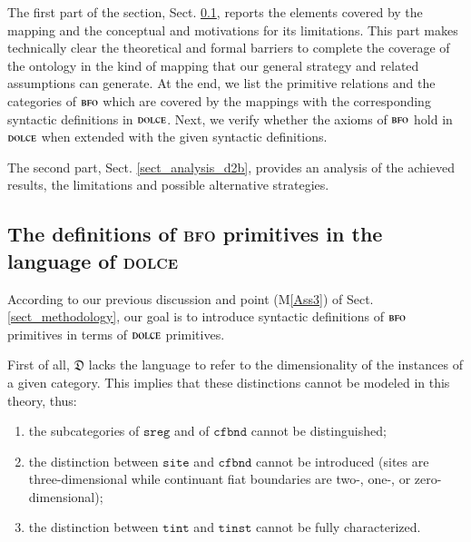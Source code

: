 \documentclass[ao]{iosart2x}
\newcommand{\nb}[1]{\textcolor{red}{$|$}\marginpar{\hspace*{-0cm}\parbox{20mm}{\scriptsize\raggedright\textcolor{red}{#1}}}}
\newcommand{\cn}[1]{\mathtt{#1}}
\newcommand{\dolce}{{\textsc{dolce}}}
\newcommand{\bfo}{{\textsc{bfo}}}
\newcommand {\thdolce} {\ensuremath{\mathfrak{D}}}
\newcommand{\sitebcat}{\cn{site}}
\newcommand{\cfbndbcat}{\cn{cfbnd}}
\newcommand{\sregbcat}{\cn{sreg}}
\newcommand{\tinstbcat}{\cn{tinst}}
\newcommand{\tintbcat}{\cn{tint}}
\begin{document}
The first part of the section, Sect. \ref{sect_mappings_d2b}, reports the elements covered by the mapping and the conceptual and motivations for its limitations. This part makes technically clear the theoretical and formal barriers to complete the coverage of the ontology in the kind of mapping that our general strategy and related assumptions can generate. 
At the end, we list the primitive relations and the categories of {$\bfo$} which are covered by the mappings with the corresponding syntactic definitions in {$\dolce$}. 
Next, we verify whether the axioms of {$\bfo$} hold in {$\dolce$} when extended with the given syntactic definitions. 

The second part, Sect. \ref{sect_analysis_d2b}, provides an analysis of the achieved results, the limitations and possible alternative strategies.


\subsection{The definitions of {\bfo} primitives in the language of {\dolce}}\label{sect_mappings_d2b}
According to our previous discussion and point (M\ref{Ass3}) of Sect. \ref{sect_methodology}, our goal is to introduce syntactic definitions of {$\bfo$} primitives in terms of {$\dolce$} primitives.

First of all, {$\thdolce$} lacks the language to refer to the dimensionality of the instances of a given category. This implies that these distinctions cannot be modeled in this theory, thus: 
\begin{enumerate}[$(i)$]
\item the subcategories of $\sregbcat$ and of $\cfbndbcat$ cannot be distinguished; %
\item the distinction between $\sitebcat$ and $\cfbndbcat$ cannot be introduced (sites are three-dimensional while continuant fiat boundaries are two-, one-, or zero-dimensional); 
\item the distinction between $\tintbcat$ and $\tinstbcat$ cannot be fully characterized.
\end{enumerate} 
\end{document}
